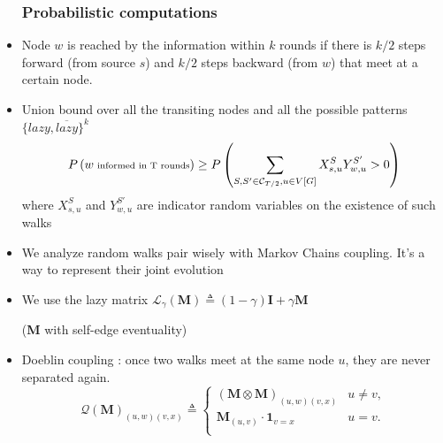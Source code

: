 \documentclass{beamer}
\renewcommand{\l}{\left}
\renewcommand{\r}{\right}
\begin{document}
\begin{frame}
\begin{itemize}
\frametitle{Probabilistic computations}
\item Node $w$ is reached by the information within $k$ rounds if there is $k/2$ steps forward (from source $s$) and $k/2$ steps backward (from $w$) that meet at a certain node.
\item  Union bound over all the transiting nodes and all the possible patterns $\{ lazy,\overline{lazy} \}^k$
\begin{align*}
  \scriptsize
  P\l(w \text{ informed in T rounds}\r) \geq P\l(\sum_{S,S'\in \mathcal C_{T/2}, u\in V[G]} X_{s,u}^S Y_{w,u}^{S'} > 0\r)
\end{align*}
 where $X_{s,u}^S$ and $Y_{w,u}^{S'}$ are indicator random variables on the existence of such walks

\end{itemize}


\end{frame}

\begin{frame}
\begin{itemize}
\frametitle{Notations}
\item We analyze random walks pair wisely with Markov Chains coupling. It's a way to represent their joint evolution
\item We use the lazy matrix $
  \mathcal L _ \gamma (\mathbf{M}) \triangleq (1-\gamma) \mathbf{I} + \gamma \mathbf{M}
$

  (\textbf{M} with self-edge eventuality)
\item Doeblin coupling  : once two walks meet at the same node $u$, they are never separated again.
\[
  \mathcal Q(\mathbf{M})_{(u,w)(v,x)} \triangleq \left\{
    \begin{array}{ll}
      (\mathbf{M} \otimes \mathbf{M})_{(u,w)(v,x)} & u \not = v,\\
      \mathbf{M}_{(u,v)} \cdot \mathbf{1}_{v = x} & u = v.\\
    \end{array}
  \right.
\]


\end{itemize}
\end{frame}
\end{document}
